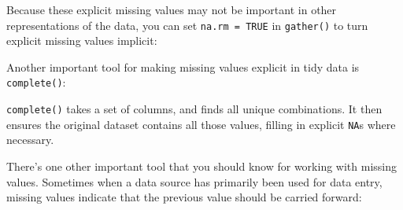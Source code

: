 \documentclass[]{book}
\newenvironment{Shaded}{\begin{snugshade}}{\end{snugshade}}
\newcommand{\KeywordTok}[1]{\textcolor[rgb]{0.13,0.29,0.53}{\textbf{{#1}}}}
\newcommand{\DataTypeTok}[1]{\textcolor[rgb]{0.13,0.29,0.53}{{#1}}}
\newcommand{\StringTok}[1]{\textcolor[rgb]{0.31,0.60,0.02}{{#1}}}
\newcommand{\CommentTok}[1]{\textcolor[rgb]{0.56,0.35,0.01}{\textit{{#1}}}}
\newcommand{\OtherTok}[1]{\textcolor[rgb]{0.56,0.35,0.01}{{#1}}}
\newcommand{\NormalTok}[1]{{#1}}
\begin{document}
Because these explicit missing values may not be important in other
representations of the data, you can set \texttt{na.rm\ =\ TRUE} in
\texttt{gather()} to turn explicit missing values implicit:

\begin{Shaded}
\end{Shaded}

Another important tool for making missing values explicit in tidy data
is \texttt{complete()}:

\begin{Shaded}
\end{Shaded}

\texttt{complete()} takes a set of columns, and finds all unique
combinations. It then ensures the original dataset contains all those
values, filling in explicit \texttt{NA}s where necessary.

There's one other important tool that you should know for working with
missing values. Sometimes when a data source has primarily been used for
data entry, missing values indicate that the previous value should be
carried forward:
\end{document}
